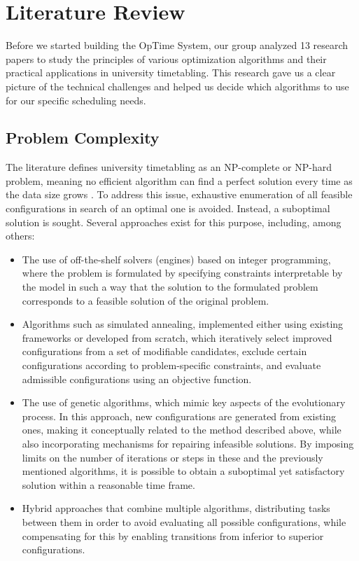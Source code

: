 \documentclass[11pt,a4paper]{article}
\begin{document}
\section{Literature Review}
Before we started building the OpTime System, our group analyzed 13 research papers to study the principles of various optimization algorithms and their practical applications in university timetabling. This research gave us a clear picture of the technical challenges and helped us decide which algorithms to use for our specific scheduling needs.

\subsection{Problem Complexity}
The literature defines university timetabling as an NP-complete or NP-hard problem, meaning no efficient algorithm can find a perfect solution every time as the data size grows \cite{burke1997automated, schaerf1999survey}. To address this issue, exhaustive enumeration of all feasible configurations in search of an optimal one is avoided. Instead, a suboptimal solution is sought. Several approaches exist for this purpose, including, among others\cite{alghamdi2020review}:

\begin{itemize}
    \item The use of off-the-shelf solvers (engines) based on integer programming, where the problem is formulated by specifying constraints interpretable by the model in such a way that the solution to the formulated problem corresponds to a feasible solution of the original problem.
    
    \item Algorithms such as simulated annealing, implemented either using existing frameworks or developed from scratch, which iteratively select improved configurations from a set of modifiable candidates, exclude certain configurations according to problem-specific constraints, and evaluate admissible configurations using an objective function.

    \item The use of genetic algorithms, which mimic key aspects of the evolutionary process. In this approach, new configurations are generated from existing ones, making it conceptually related to the method described above, while also incorporating mechanisms for repairing infeasible solutions. By imposing limits on the number of iterations or steps in these and the previously mentioned algorithms, it is possible to obtain a suboptimal yet satisfactory solution within a reasonable time frame.\cite{Kristiadi2019}
    
    \item Hybrid approaches that combine multiple algorithms, distributing tasks between them in order to avoid evaluating all possible configurations, while compensating for this by enabling transitions from inferior to superior configurations.\cite{Yunita2018}
\end{itemize}
\end{document}
